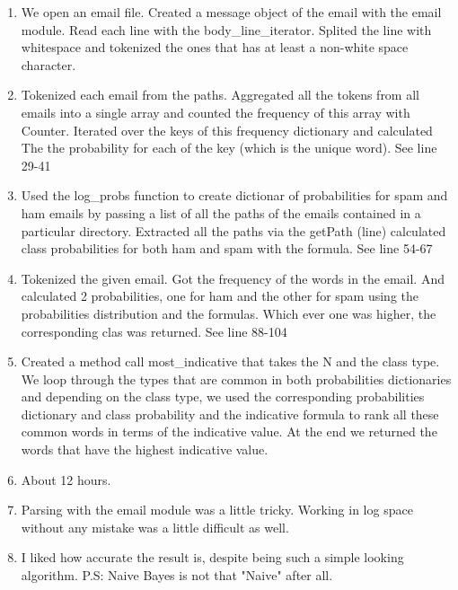 \documentclass[11pt]{article}
\begin{document}
\begin{enumerate}

    \item We open an email file. Created a message object of the email with the email module. Read each line with the body\_line\_iterator. 
    Splited the line with whitespace and tokenized the ones that has at least a non-white space character.
    \item Tokenized each email from the paths. Aggregated all the tokens from all emails into a single array and counted the frequency of this array with Counter. 
    Iterated over the keys of this frequency dictionary and calculated The
    the probability for each of the key (which is the unique word). See line 29-41


    \item Used the log\_probs function to create dictionar of probabilities for spam and ham emails by passing
    a list of all the paths of the emails contained in a particular directory. Extracted all the paths via the getPath (line)
    calculated class probabilities for both ham and spam with the formula. See line 54-67

    \item Tokenized the given email. Got the frequency of the words in the email. And calculated 2 probabilities, one for ham
    and the other for spam using the probabilities distribution and the formulas. Which ever one was higher, the corresponding clas was returned.
    See line 88-104

    \item Created a method call most\_indicative that takes the N and the class type.
     We loop through the types that are common in both probabilities dictionaries and depending on the class type, 
     we used the corresponding probabilities dictionary and class probability and the indicative formula to rank all 
     these common words in terms of the indicative value. At the end we returned the words that have the highest indicative value. 
    
    \item About 12 hours. 
    \item Parsing with the email module was a little tricky. Working in log space without any mistake was a
    little difficult as well.

    \item I liked how accurate the result is, despite being such a simple looking algorithm. P.S: Naive Bayes is not that "Naive" after all. 
    
    
\end{enumerate}
\end{document}
